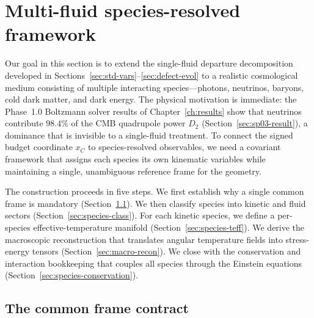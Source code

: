 

\section{Multi-fluid species-resolved framework}
\label{sec:multi-fluid}

Our goal in this section is to extend the single-fluid
departure decomposition developed in
Sections~\ref{sec:std-vars}--\ref{sec:defect-evol} to a
realistic cosmological medium consisting of multiple
interacting species---photons, neutrinos, baryons, cold dark
matter, and dark energy.  The physical motivation is
immediate: the Phase~1.0 Boltzmann solver results of
Chapter~\ref{ch:results} show that neutrinos contribute
$98.4\%$ of the CMB quadrupole power $D_2$
(Section~\ref{sec:sp03-result}), a dominance that is
invisible to a single-fluid treatment.  To connect the
signed budget coordinate $x_C$ to species-resolved observables, we
need a covariant framework that assigns each species its own
kinematic variables while maintaining a single, unambiguous
reference frame for the geometry.

The construction proceeds in five steps.  We first establish
why a single common frame is mandatory
(Section~\ref{sec:common-frame}).  We then classify species
into kinetic and fluid sectors
(Section~\ref{sec:species-class}).  For each kinetic species,
we define a per-species effective-temperature manifold
(Section~\ref{sec:species-teff}).  We derive the macroscopic
reconstruction that translates angular temperature fields
into stress-energy tensors
(Section~\ref{sec:macro-recon}).  We close with the
conservation and interaction bookkeeping that couples
all species through the Einstein equations
(Section~\ref{sec:species-conservation}).


\subsection{The common frame contract}
\label{sec:common-frame}

